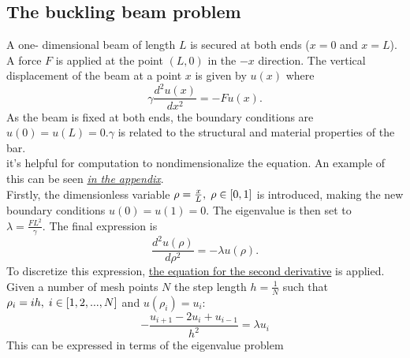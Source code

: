\documentclass[10pt,a4paper]{article}
\begin{document}
\subsection{The buckling beam problem}
A one- dimensional beam of length $L$ is secured at both ends ($x=0$ and $x=L$). A force $F$ is applied at the point $(L,0)$ in the $-x$ direction. The vertical displacement of the beam at a point $x$ is given by $u(x)$ where
$$
\gamma \frac{d^2 u(x)}{dx^2} = -F u(x).
$$
As the beam is fixed at both ends, the boundary conditions are $u(0)=u(L)=0$.$\gamma$ is related to the structural and material properties of the bar.\\it's helpful for computation to nondimensionalize the equation. An example of this can be seen \hyperref[nondim_2_el]{\emph{in the appendix}}.\\Firstly, the dimensionless variable $\rho =\frac{x}{L},\hspace{1mm} \rho \in [0,1]$ is introduced, making the new boundary conditions $u(0)=u(1)=0$. The eigenvalue is then set to\\$\lambda = \frac{FL^2}{\gamma}.$ The final expression is
\begin{equation*}
\frac{d^2u(\rho)}{d\rho^2}=-\lambda u(\rho).
\end{equation*} 
To discretize this expression, \hyperref[2nd derivative]{the equation for the second derivative} is applied.\\Given a number of mesh points $N$ the step length $h=\frac{1}{N}$ such that\\$\rho_i=ih, \hspace{1mm} i \in [1,2,...,N]$ and $u(\rho_i)=u_i$:
\begin{equation*}
-\frac{u_{i+1}-2u_i+u_{i-1}}{h^2}=\lambda u_i
\end{equation*}
This can be expressed in terms of the eigenvalue problem
\end{document}
